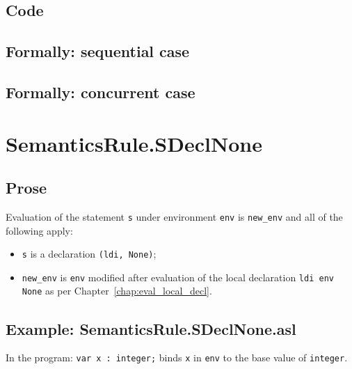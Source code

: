 \documentclass{book}
\begin{document}
  \subsection{Code}

\begin{emptyformal}
  \subsection{Formally: sequential case}

  \subsection{Formally: concurrent case}
\end{emptyformal}


\section{SemanticsRule.SDeclNone \label{sec:SemanticsRule.SDeclNone}}

    \subsection{Prose}
  Evaluation of the statement \texttt{s} under environment \texttt{env} is
\texttt{new\_env} and all of the following apply:
    \begin{itemize}
    \item \texttt{s} is a declaration \texttt{(ldi, None)};
    \item \texttt{new\_env} is \texttt{env} modified after evaluation of the local declaration
      \texttt{ldi env None} as per Chapter~\ref{chap:eval_local_decl}.
    \end{itemize}

    \subsection{Example: SemanticsRule.SDeclNone.asl}
    In the program:
    \texttt{var x : integer;} binds \texttt{x} in \texttt{env} to the base value of \texttt{integer}.
\end{document}
